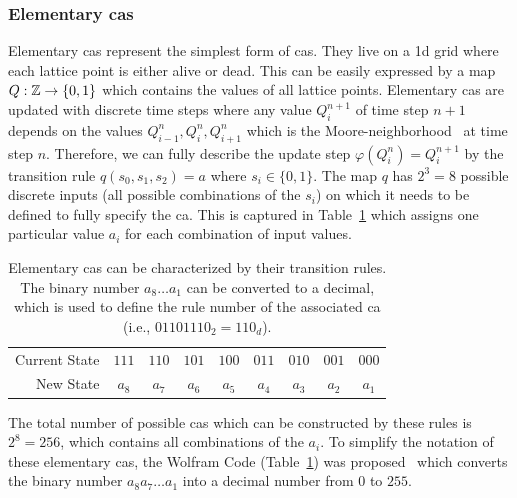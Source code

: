 \subsubsection{Elementary \acp{ca}}
\label{subsection:elemntary-ca}
Elementary \acp{ca} represent the simplest form of \acp{ca}.
They live on a \ac{1d} grid where each lattice point is either alive or dead.
This can be easily expressed by a map $Q:\mathbb{Z}\rightarrow\{0,1\}$ which contains the values of all
lattice points.
Elementary \acp{ca} are updated with discrete time steps where any value $Q_i^{n+1}$ of time step
$n+1$ depends on the values $Q_{i-1}^n,Q_i^n,Q_{i+1}^n$ which is the
Moore-neighborhood~\cite{Moore1962} at time step $n$.
Therefore, we can fully describe the update step $\varphi(Q^n_i)=Q^{n+1}_i$ by the transition rule
$q(s_0,s_1,s_2)=a$ where $s_i\in\{0,1\}$.
The map $q$ has $2^3=8$ possible discrete inputs (all possible combinations of the $s_i$) on which
it needs to be defined to fully specify the \ac{ca}.
This is captured in Table~\ref{table:wolfram-code} which assigns one particular value $a_i$ for each
combination of input values.

\begin{table}
    \centering
    \begin{tabular}{ r c c c c c c c c }
        \toprule
        Current State & $111$ & $110$ & $101$ & $100$ & $011$ & $010$ & $001$ & $000$\\
        New State & $a_8$ & $a_7$ & $a_6$ & $a_5$ & $a_4$ & $a_3$ & $a_2$ & $a_1$\\
        \bottomrule
    \end{tabular}
    \caption{
        Elementary \acp{ca} can be characterized by their transition rules.
        The binary number $a_8\dots a_1$ can be converted to a decimal, which is used to define the
        rule number of the associated \ac{ca} (i.e., $01101110_2=110_d$).
    }
    \label{table:wolfram-code}
\end{table}

The total number of possible \acp{ca} which can be constructed by these rules is $2^8=256$, which
contains all combinations of the $a_i$.
To simplify the notation of these elementary \acp{ca}, the Wolfram Code
(Table~\ref{table:wolfram-code}) was proposed~\cite{Wolfram1994-yw} which converts the binary
number $a_8 a_7 \dots a_1$ into a decimal number from $0$ to $255$.


